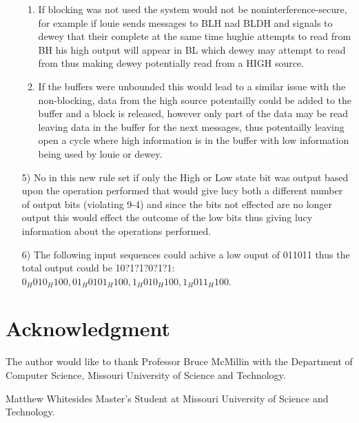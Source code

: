 \documentclass[journal,onecolumn]{IEEEtran}
\begin{document}
\begin{enumerate}
  \begin{enumerate}
    \item If blocking was not used the system would not be noninterference-secure, for example if louie sends messages to BLH nad BLDH and signals to dewey that their complete at the same time hughie attempts to read from BH his high output will appear in BL which dewey may attempt to read from thus making dewey potentially read from a HIGH source. 
    \item If the buffers were unbounded this would lead to a similar issue with the non-blocking, data from the high source potentailly could be added to the buffer and a block is released, however only part of the data may be read leaving data in the buffer for the next messages, thus potentailly leaving open a cycle where high information is in the buffer with low information being used by louie or dewey. 
  \end{enumerate}
  \item [5)] No in this new rule set if only the High or Low state bit was output based upon the operation performed that would give lucy both a different number of output bits (violating 9-4) and since the bits not effected are no longer output this would effect the outcome of the low bits thus giving lucy information about the operations performed.
  \item [6)] The following input sequences could achive a low ouput of 011011 thus the total output could be 10?1?1?0?1?1: $0_H010_H100,01_H0101_H100,1_H010_H100,1_H011_H100$.
\end{enumerate}




\section*{Acknowledgment}
The author would like to thank Professor Bruce McMillin with the Department of Computer Science, Missouri University of Science and Technology.

\ifCLASSOPTIONcaptionsoff
  \newpage
\fi

\begin{IEEEbiographynophoto}{Matthew Whitesides}
  Master's Student at Missouri University of Science and Technology.
\end{IEEEbiographynophoto}

\end{document}
